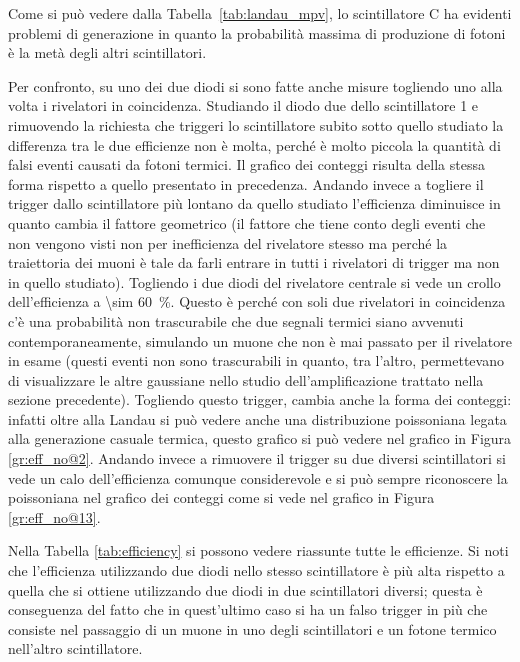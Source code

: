 
Come si pu\`o vedere dalla Tabella~\ref{tab:landau_mpv}, lo scintillatore C ha evidenti problemi di generazione in quanto la probabilit\`a massima di produzione di fotoni \`e la met\`a degli altri scintillatori.

Per confronto, su uno dei due diodi si sono fatte anche misure togliendo uno alla volta i rivelatori in coincidenza. Studiando il diodo due dello scintillatore 1 e rimuovendo la richiesta che triggeri lo scintillatore subito sotto quello studiato la differenza tra le due efficienze non è molta, perché è molto piccola la quantità di falsi eventi causati da fotoni termici. Il grafico dei conteggi risulta della stessa forma rispetto a quello presentato in precedenza. Andando invece a togliere il trigger dallo scintillatore più lontano da quello studiato l'efficienza diminuisce in quanto cambia il fattore geometrico (il fattore che tiene conto degli eventi che non vengono visti non per inefficienza del rivelatore stesso ma perché la traiettoria dei muoni è tale da farli entrare in tutti i rivelatori di trigger ma non in quello studiato). Togliendo i due diodi del rivelatore centrale si vede un crollo dell'efficienza a \SI{\sim 60}{\percent}. Questo \`e perch\'e con soli due rivelatori in coincidenza c'\`e una probabilit\`a non trascurabile che due segnali termici siano avvenuti contemporaneamente, simulando un muone che non \`e mai passato per il rivelatore in esame (questi eventi non sono trascurabili in quanto, tra l'altro, permettevano di visualizzare le altre gaussiane nello studio dell'amplificazione trattato nella sezione precedente). Togliendo questo trigger, cambia anche la forma dei conteggi: infatti oltre alla Landau si può vedere anche una distribuzione poissoniana legata alla generazione casuale termica, questo grafico si può vedere nel grafico in Figura \ref{gr:eff_no@2}. Andando invece a rimuovere il trigger su due diversi scintillatori si vede un calo dell'efficienza comunque considerevole e si può sempre riconoscere la poissoniana nel grafico dei conteggi come si vede nel grafico in Figura \ref{gr:eff_no@13}.\\

Nella Tabella \ref{tab:efficiency} si possono vedere riassunte tutte le efficienze. Si noti che l'efficienza utilizzando due diodi nello stesso scintillatore è più alta rispetto a quella che si ottiene utilizzando due diodi in due scintillatori diversi; questa è conseguenza del fatto che in quest'ultimo caso si ha un falso trigger in più che consiste nel passaggio di un muone in uno degli scintillatori e un fotone termico nell'altro scintillatore.

